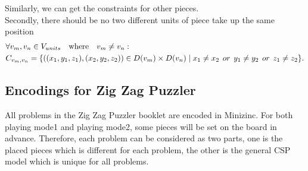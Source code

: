Similarly, we can get the constraints for other pieces.
\\Secondly, there should be no two different units of piece take up the same position
\begin{equation}
\label{equ:3Dfirstconstrain}
\begin{aligned}
&\forall v_{m},v_{n} \in \VUnits\quad \text{where} \quad v_{m} \neq v_{n}:\\
&\Constraints{m}{n}=\{((x_{1},y_{1},z_{1}),(x_{2},y_{2},z_{2}))\in \Domain{m} \times \Domain{n}\mid x_{1} \neq x_{2}   \hspace{1ex} or \hspace{1ex}  y_{1} \neq y_{2} \hspace{1ex} or \hspace{1ex}  z_{1} \neq z_{2}\}.
\end{aligned}
\end{equation}
\subsection{Encodings for Zig Zag Puzzler}
All problems in the Zig Zag Puzzler booklet are encoded in Minizinc. For both playing mode1 and playing mode2, some pieces will be set on the board in advance. Therefore, each problem can be considered as two parts, one is the placed pieces which is different for each problem, the other is the general CSP model which is unique for all problems. 
